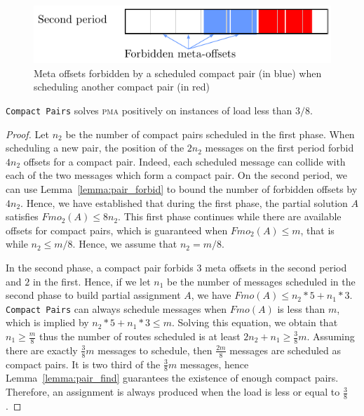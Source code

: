 \documentclass[a4paper,cleveref, autoref, thm-restate,UKenglish]{lipics-v2019}
\newcommand\pma{\textsc{pma}\xspace}
\newcommand\compactpair{\texttt{Compact Pairs}\xspace}
\begin{document}
\begin{figure}
\begin{center}
\includegraphics[scale=0.7]{pairforbiden}
\end{center}

\caption{Meta offsets forbidden by a scheduled compact pair (in blue) when scheduling another compact pair (in red)} 
\label{fig:forbidenmeta}
\end{figure}
\begin{theorem}
\compactpair solves \pma positively on instances of load less than
$3/8$.
\end{theorem}
\begin{proof}
Let $n_2$ be the number of compact pairs scheduled in the first phase. When scheduling a new pair, the position of the $2n_2$ messages on the first period forbid $4n_2$ offsets for a compact pair. Indeed, each scheduled message can collide
with each of the two messages which form a compact pair. On the second period, we can use Lemma~\ref{lemma:pair_forbid} to bound the number of forbidden offsets by $4n_2$. 
Hence, we have established that during the first phase, the partial solution $A$
satisfies $Fmo_2(A) \leq 8n_2$. This first phase continues while there are available offsets for compact pairs, which is guaranteed when $Fmo_2(A) \leq m$, that is while $n_2 \leq m/8$. Hence, we assume that $n_2 = m/8$.

In the second phase, a compact pair forbids $3$ meta offsets in the 
second period and $2$ in the first. Hence, if we let $n_1$ be the number of messages scheduled in the second phase to build partial assignment $A$, we have $Fmo(A) \leq n_2*5 + n_1*3$. 
\compactpair can always schedule messages when $Fmo(A)$ is less than $m$, which is implied by $n_2*5 + n_1*3 \leq m$.
Solving this equation, we obtain that $n_1 \geq \frac{m}{8}$ thus the number of routes scheduled is at least $2n_2 + n_1 \geq \frac{3}{8}m$. Assuming there are exactly $\frac{3}{8}m$ messages to schedule, then $\frac{2m}{8}$ messages are scheduled as compact pairs. It is two third of the $\frac{3}{8}m$ messages, hence Lemma~\ref{lemma:pair_find} guarantees the existence of enough compact pairs. Therefore, an assignment is always produced when the load is less or equal to $\frac{3}{8}$.
\end{proof}
\end{document}
